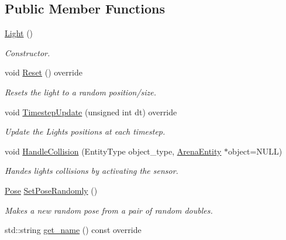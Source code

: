 \subsection*{Public Member Functions}
\begin{DoxyCompactItemize}
\item 
\hyperlink{classLight_aeb5df09a25a32f19fdffa761268ba24f}{Light} ()\hypertarget{classLight_aeb5df09a25a32f19fdffa761268ba24f}{}\label{classLight_aeb5df09a25a32f19fdffa761268ba24f}

\begin{DoxyCompactList}\small\item\em Constructor. \end{DoxyCompactList}\item 
void \hyperlink{classLight_a61485eb0684868b503e1b96e6a3206c3}{Reset} () override\hypertarget{classLight_a61485eb0684868b503e1b96e6a3206c3}{}\label{classLight_a61485eb0684868b503e1b96e6a3206c3}

\begin{DoxyCompactList}\small\item\em Resets the light to a random position/size. \end{DoxyCompactList}\item 
void \hyperlink{classLight_a97934eec7489f9b072534f5e30a2d90d}{Timestep\+Update} (unsigned int dt) override
\begin{DoxyCompactList}\small\item\em Update the Lights\textquotesingle{} positions at each timestep. \end{DoxyCompactList}\item 
void \hyperlink{classLight_a7b8ef784bba9ec5725b0b0595e7da850}{Handle\+Collision} (Entity\+Type object\+\_\+type, \hyperlink{classArenaEntity}{Arena\+Entity} $\ast$object=N\+U\+LL)\hypertarget{classLight_a7b8ef784bba9ec5725b0b0595e7da850}{}\label{classLight_a7b8ef784bba9ec5725b0b0595e7da850}

\begin{DoxyCompactList}\small\item\em Handes lights\textquotesingle{} collisions by activating the sensor. \end{DoxyCompactList}\item 
\hyperlink{structPose}{Pose} \hyperlink{classLight_a7ba6c291707a71363ea8d9e45746713d}{Set\+Pose\+Randomly} ()\hypertarget{classLight_a7ba6c291707a71363ea8d9e45746713d}{}\label{classLight_a7ba6c291707a71363ea8d9e45746713d}

\begin{DoxyCompactList}\small\item\em Makes a new random pose from a pair of random doubles. \end{DoxyCompactList}\item 
std\+::string \hyperlink{classLight_a49b2e32cf8173353ac4689fdadbb95d5}{get\+\_\+name} () const override\hypertarget{classLight_a49b2e32cf8173353ac4689fdadbb95d5}{}\label{classLight_a49b2e32cf8173353ac4689fdadbb95d5}


\end{DoxyCompactItemize}
